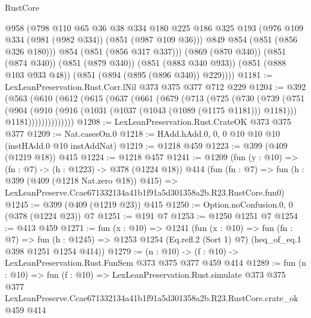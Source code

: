 \begin{lexlean}{RustCore}
\begin{coremodule}
          @958
          (@798
            @110
            @65
            @36
            @38
            @334
            @180
            @225
            @186
            @325
            @193
            (@976 @109 @334 (@981 (@982 @334)) (@851 (@987 @109 @36)))
            @849
            @854
            (@851 (@856 @326 @180)))
          @854
          (@851 (@856 @317 @337)))
        (@869 (@870 @340))
        (@851 (@874 @340))
        (@851 (@879 @340))
        (@851 (@883 @340 @933))
        (@851 (@888 @103 @933 @48))
        (@851 (@894 (@895 (@896 @340)) @229))))
@1181 := LexLeanPreservation.Rust.Corr.lNil @373 @375 @377 @712 @229
@1204 := @392
    (@563
      (@610
        (@612
          (@615
            (@637
              (@661
                (@679
                  (@713
                    (@725
                      (@730
                        (@739
                          (@751
                            (@904
                              (@910
                                (@916 (@1031 (@1037 (@1043 (@1089 (@1175 @1181))) @1181)))
                                @1181))))))))))))))
@1208 := LexLeanPreservation.Rust.CrateOK @373 @375 @377
@1209 := Nat.casesOn.{0}
@1218 := HAdd.hAdd.{0, 0, 0} @10 @10 @10 (instHAdd.{0} @10 instAddNat)
@1219 := @1218 @459
@1223 := @399 (@409 (@1219 @18)) @415
@1224 := @1218 @457
@1241 := @1209
    (fun (y : @10) => (fn : @7) -> (h : @1223) -> @378 (@1224 @18))
    @414
    (fun (fn : @7) =>
    fun (h : @399 (@409 (@1218 Nat.zero @18)) @415) =>
    LexLeanPreserve.Ccae671332134a41b1f91a5d301358a2b.R23.RustCore.fun0)
@1245 := @399 (@409 (@1219 @23)) @415
@1250 := Option.noConfusion.{0, 0} (@378 (@1224 @23)) @7
@1251 := @191 @7
@1253 := @1250 @1251 @7
@1254 := @413 @459
@1271 := fun (x : @10) =>
  @1241
    (fun (x : @10) =>
    fun (fn : @7) =>
    fun (h : @1245) => @1253 @1254 (Eq.refl.{2} (Sort 1) @7) (heq_of_eq.{1} @398 @1251 @1254 @414))
@1279 := (n : @10) -> (f : @10) -> LexLeanPreservation.Rust.FunSem @373 @375 @377 @459 @414
@1289 := fun (n : @10) =>
  fun (f : @10) =>
  LexLeanPreservation.Rust.simulate
    @373
    @375
    @377
    LexLeanPreserve.Ccae671332134a41b1f91a5d301358a2b.R23.RustCore.crate_ok
    @459
    @414
\end{coremodule}
\end{lexlean}

